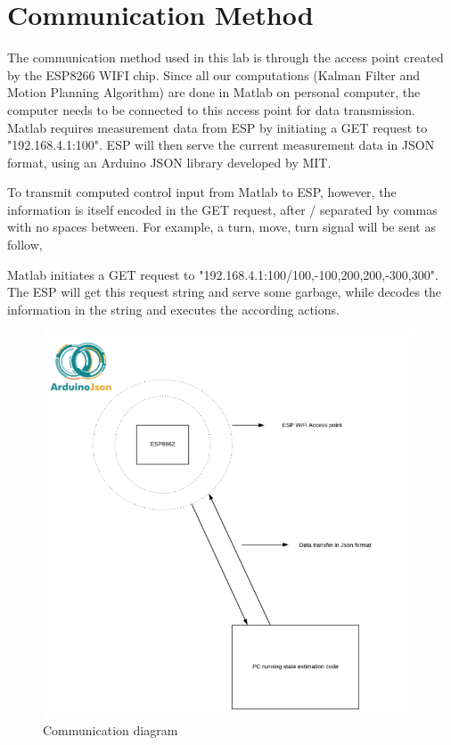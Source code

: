 \documentclass[12pt, letterpaper]{amsart} %
\numberwithin{equation}{section}
\begin{document}
\section{Communication Method}
The communication method used in this lab is through the access point created by the ESP8266 WIFI chip. Since all our computations (Kalman Filter and Motion Planning Algorithm) are done in Matlab on personal computer, the computer needs to be connected to this access point for data transmission. Matlab requires measurement data from ESP by initiating a GET request to "192.168.4.1:100". ESP will then serve the current measurement data in JSON format, using an Arduino JSON library developed by MIT. \par
To transmit computed control input from Matlab to ESP, however, the information is itself encoded in the GET request, after / separated by commas with no spaces between. For example, a turn, move, turn signal will be sent as follow, \par
Matlab initiates a GET request to  "192.168.4.1:100/100,-100,200,200,-300,300". The ESP will get this request string and serve some garbage, while decodes the information in the string and executes the according actions.  


\begin{figure}[h!]
\includegraphics[width=110mm]{./img/fig_3.png}
\caption{Communication diagram}
\label{fig:figure3}
\end{figure}

\newpage
\end{document}
